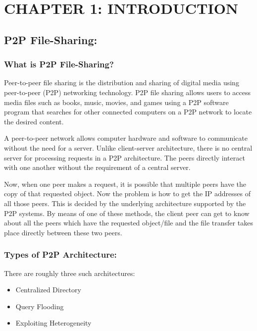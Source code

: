 \documentclass[a4paper,12pt]{article}
\begin{document}
\clearpage
\section{\large CHAPTER 1: INTRODUCTION}

\subsection{P2P File-Sharing:}

\subsubsection{What is P2P File-Sharing?}
Peer-to-peer\cite{p2p} file sharing is the distribution and sharing of digital media using peer-to-peer (P2P) networking technology. P2P file sharing allows users to access media files such as books, music, movies, and games using a P2P software program that searches for other connected computers on a P2P network to locate the desired content.

A peer-to-peer network allows computer hardware and software to communicate without the need for a server. Unlike client-server architecture, there is no central server for processing requests in a P2P architecture. The peers directly interact with one another without the requirement of a central server.

Now, when one peer makes a request, it is possible that multiple peers have the copy of that requested object. Now the problem is how to get the IP addresses of all those peers. This is decided by the underlying architecture supported by the P2P systems. By means of one of these methods, the client peer can get to know about all the peers which have the requested object/file and the file transfer takes place directly between these two peers.

\subsubsection{Types of P2P Architecture:}

There are roughly three such architectures:
\begin{itemize}
\itemsep0em

\item Centralized Directory

\item Query Flooding

\item Exploiting Heterogeneity

\end{itemize}
\end{document}
